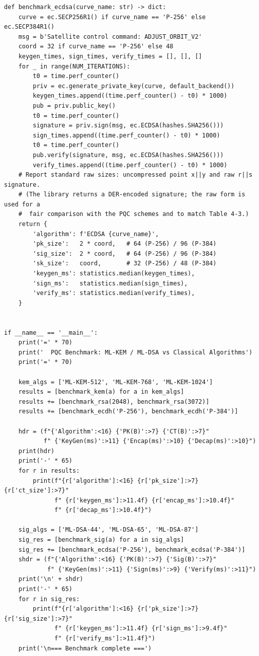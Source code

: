 \documentclass[a4paper,14pt]{extreport}
\begin{document}
\begin{latin}
\begin{verbatim}
def benchmark_ecdsa(curve_name: str) -> dict:
    curve = ec.SECP256R1() if curve_name == 'P-256' else ec.SECP384R1()
    msg = b'Satellite control command: ADJUST_ORBIT_V2'
    coord = 32 if curve_name == 'P-256' else 48
    keygen_times, sign_times, verify_times = [], [], []
    for _ in range(NUM_ITERATIONS):
        t0 = time.perf_counter()
        priv = ec.generate_private_key(curve, default_backend())
        keygen_times.append((time.perf_counter() - t0) * 1000)
        pub = priv.public_key()
        t0 = time.perf_counter()
        signature = priv.sign(msg, ec.ECDSA(hashes.SHA256()))
        sign_times.append((time.perf_counter() - t0) * 1000)
        t0 = time.perf_counter()
        pub.verify(signature, msg, ec.ECDSA(hashes.SHA256()))
        verify_times.append((time.perf_counter() - t0) * 1000)
    # Report standard raw sizes: uncompressed point x||y and raw r||s signature.
    # (The library returns a DER-encoded signature; the raw form is used for a
    #  fair comparison with the PQC schemes and to match Table 4-3.)
    return {
        'algorithm': f'ECDSA {curve_name}',
        'pk_size':   2 * coord,   # 64 (P-256) / 96 (P-384)
        'sig_size':  2 * coord,   # 64 (P-256) / 96 (P-384)
        'sk_size':   coord,       # 32 (P-256) / 48 (P-384)
        'keygen_ms': statistics.median(keygen_times),
        'sign_ms':   statistics.median(sign_times),
        'verify_ms': statistics.median(verify_times),
    }


if __name__ == '__main__':
    print('=' * 70)
    print('  PQC Benchmark: ML-KEM / ML-DSA vs Classical Algorithms')
    print('=' * 70)

    kem_algs = ['ML-KEM-512', 'ML-KEM-768', 'ML-KEM-1024']
    results = [benchmark_kem(a) for a in kem_algs]
    results += [benchmark_rsa(2048), benchmark_rsa(3072)]
    results += [benchmark_ecdh('P-256'), benchmark_ecdh('P-384')]

    hdr = (f"{'Algorithm':<16} {'PK(B)':>7} {'CT(B)':>7}"
           f" {'KeyGen(ms)':>11} {'Encap(ms)':>10} {'Decap(ms)':>10}")
    print(hdr)
    print('-' * 65)
    for r in results:
        print(f"{r['algorithm']:<16} {r['pk_size']:>7} {r['ct_size']:>7}"
              f" {r['keygen_ms']:>11.4f} {r['encap_ms']:>10.4f}"
              f" {r['decap_ms']:>10.4f}")

    sig_algs = ['ML-DSA-44', 'ML-DSA-65', 'ML-DSA-87']
    sig_res = [benchmark_sig(a) for a in sig_algs]
    sig_res += [benchmark_ecdsa('P-256'), benchmark_ecdsa('P-384')]
    shdr = (f"{'Algorithm':<16} {'PK(B)':>7} {'Sig(B)':>7}"
            f" {'KeyGen(ms)':>11} {'Sign(ms)':>9} {'Verify(ms)':>11}")
    print('\n' + shdr)
    print('-' * 65)
    for r in sig_res:
        print(f"{r['algorithm']:<16} {r['pk_size']:>7} {r['sig_size']:>7}"
              f" {r['keygen_ms']:>11.4f} {r['sign_ms']:>9.4f}"
              f" {r['verify_ms']:>11.4f}")
    print('\n=== Benchmark complete ===')
\end{verbatim}
\end{latin}
\end{document}
